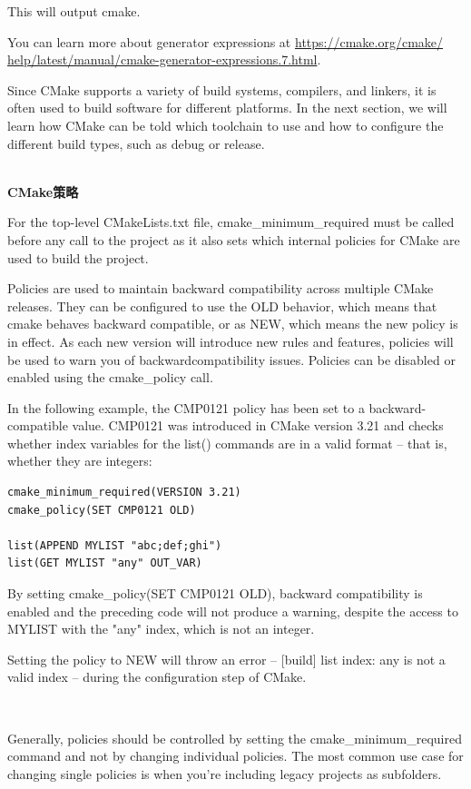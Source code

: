 This will output cmake. 

You can learn more about generator expressions at \url{https://cmake.org/cmake/
help/latest/manual/cmake-generator-expressions.7.html}.

Since CMake supports a variety of build systems, compilers, and linkers, it is often used to build software for different platforms. In the next section, we will learn how CMake can be told which toolchain to use and how to configure the different build types, such as debug or release.

\hspace*{\fill} \\ %
\noindent
\textbf{CMake策略}

For the top-level CMakeLists.txt file, cmake\_minimum\_required must be called before any call to the project as it also sets which internal policies for CMake are used to build the project.

Policies are used to maintain backward compatibility across multiple CMake releases. They can be configured to use the OLD behavior, which means that cmake behaves backward compatible, or as NEW, which means the new policy is in effect. As each new version will introduce new rules and features, policies will be used to warn you of backwardcompatibility issues. Policies can be disabled or enabled using the cmake\_policy call.

In the following example, the CMP0121 policy has been set to a backward-compatible value. CMP0121 was introduced in CMake version 3.21 and checks whether index variables for the list() commands are in a valid format – that is, whether they are integers:

\begin{lstlisting}[style=styleCMake]
cmake_minimum_required(VERSION 3.21)
cmake_policy(SET CMP0121 OLD)

list(APPEND MYLIST "abc;def;ghi")
list(GET MYLIST "any" OUT_VAR)
\end{lstlisting}

By setting cmake\_policy(SET CMP0121 OLD), backward compatibility is enabled and the preceding code will not produce a warning, despite the access to MYLIST with the "any" index, which is not an integer.

Setting the policy to NEW will throw an error – [build] list index: any is not
a valid index – during the configuration step of CMake.

\hspace*{\fill} \\ %
\begin{tcolorbox}[colback=blue!5!white,colframe=blue!75!black,title=Avoid Setting Single Policies Except When You're Including Legacy Projects]
Generally, policies should be controlled by setting the cmake\_minimum\_required command and not by changing individual policies. The most common use case for changing single policies is when you're including legacy projects as subfolders.
\end{tcolorbox}

